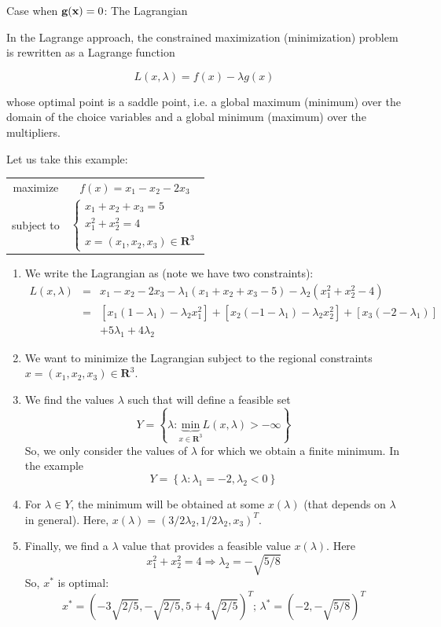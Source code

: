 \documentclass[c]{beamer}
\begin{document}
\begin{frame}[allowframebreaks]{Case when $\textbf{g}(\textbf{x})= 0$: The Lagrangian}

  In the Lagrange approach, the constrained maximization (minimization) problem is rewritten as a Lagrange function 
  
  \[L(x,\lambda)=f(x)-\lambda g(x)\]
  
  whose optimal point is a saddle point, i.e. a global maximum (minimum) over the domain of the choice variables and a global minimum (maximum) over the multipliers.

  Let us take this example:
  \begin{center}
  \begin{tabular}{cc}
    maximize & $f(x)=x_1-x_2-2x_3$ \\
    subject to & $\begin{cases}x_1+x_2+x_3=5\\x_1^2+x_2^2=4\\x=(x_1,x_2,x_3)\in \mathbf{R}^3\end{cases}$
  \end{tabular}
\end{center}
\begin{enumerate}
  \item We write the Lagrangian as (note we have two constraints):
  \begin{eqnarray*}
    L(x,\lambda)&=&x_1-x_2-2x_3-\lambda_1 (x_1+x_2+x_3-5)-\lambda_2(x_1^2+x_2^2-4)\\
    &=& [x_1(1-\lambda_1)-\lambda_2x_1^2]+[x_2(-1-\lambda_1)-\lambda_2x_2^2]+[x_3(-2-\lambda_1)]\\
    &&+5\lambda_1+4\lambda_2
  \end{eqnarray*}
  \item We want to minimize the Lagrangian subject to the regional constraints $x=(x_1,x_2,x_3)\in \mathbf{R}^3$.
  \item We find the values $\lambda$ such that will define a feasible set
  \[
  Y=\left\{\lambda: \underbrace{\mathrm{min}}_{x\in  \mathbf{R}^3} L(x,\lambda) >-\infty \right\}
  \]
  So, we only consider the values of $\lambda$ for which we obtain a finite minimum. In the example
  \[
  Y=\left\{\lambda: \lambda_1=-2, \lambda_2<0 \right\}
  \]
  \item For $\lambda \in Y$, the minimum will be obtained at some $x(\lambda)$ (that depends on $\lambda$ in general). Here, $x(\lambda)=(3/2\lambda_2,1/2\lambda_2,x_3)^T$.
  \item Finally, we find a $\lambda$ value that provides a feasible value $x(\lambda)$. Here
  \[
    x_1^2+x_2^2=4 \Rightarrow \lambda_2 = -\sqrt{5/8}
  \]
  So, $x^*$ is optimal:
  \[
    x^* =(-3\sqrt{2/5},-\sqrt{2/5},5+4\sqrt{2/5})^T; \, \lambda^*=(-2,-\sqrt{5/8})^T
  \]
\end{enumerate}

\end{frame}
\end{document}
